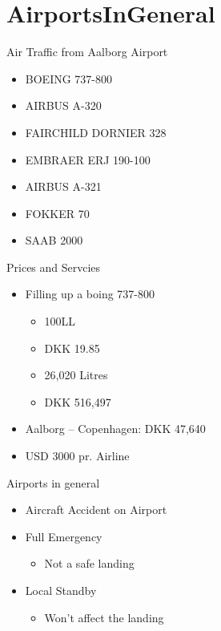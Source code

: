\section{AirportsInGeneral}

\begin{frame}{Air Traffic from Aalborg Airport}{}
	\begin{itemize}
		\item BOEING 737-800 
		\item AIRBUS A-320 
		\item FAIRCHILD DORNIER 328 
		\item EMBRAER ERJ 190-100 
		\item AIRBUS A-321 
		\item FOKKER 70 
		\item SAAB 2000 
	\end{itemize}
\end{frame}

\begin{frame}{Prices and Servcies}{}
	\begin{itemize}
		\item Filling up a boing 737-800
			\begin{itemize}
				\item 100LL
				\item DKK 19.85
				\item 26,020 Litres
				\item DKK 516,497
			\end{itemize}
		\item Aalborg – Copenhagen: DKK 47,640
		\item USD 3000 pr. Airline
	\end{itemize}
\end{frame}

\begin{frame}{Airports in general}{}
	\begin{itemize}
		\item Aircraft Accident on Airport
		\item Full Emergency
			\begin{itemize}
				\item Not a safe landing
			\end{itemize}
		\item Local Standby
			\begin{itemize}
				\item Won't affect the landing
			\end{itemize}
	\end{itemize}
\end{frame}